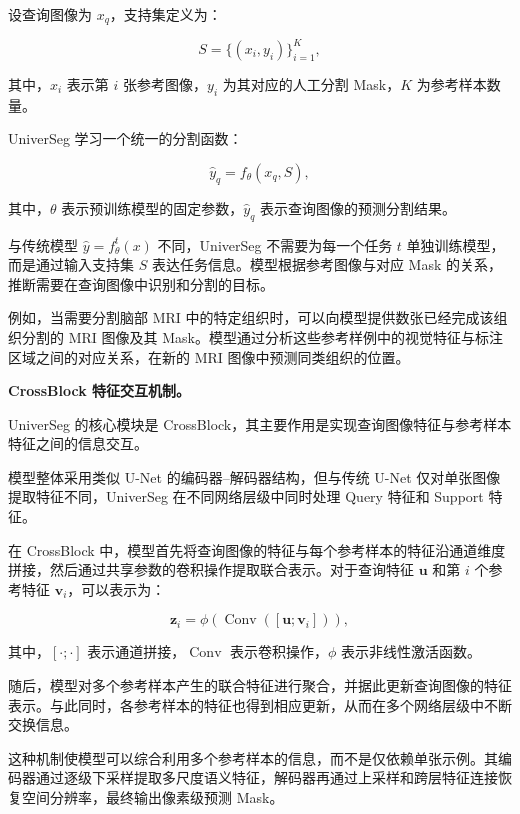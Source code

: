\documentclass[10.5pt,compsoc]{CjC}
\theoremstyle{mystyle}
\begin{document}
设查询图像为 $x_q$，支持集定义为：

\begin{equation}
S=\{(x_i,y_i)\}_{i=1}^{K},
\label{eq:universeg_support}
\end{equation}

其中，$x_i$ 表示第 $i$ 张参考图像，$y_i$ 为其对应的人工分割 Mask，$K$ 为参考样本数量。

UniverSeg 学习一个统一的分割函数：

\begin{equation}
\hat{y}_q=f_{\theta}(x_q,S),
\label{eq:universeg_forward}
\end{equation}

其中，$\theta$ 表示预训练模型的固定参数，$\hat{y}_q$ 表示查询图像的预测分割结果。

与传统模型 $\hat{y}=f_{\theta}^{t}(x)$ 不同，UniverSeg 不需要为每一个任务 $t$ 单独训练模型，而是通过输入支持集 $S$ 表达任务信息。模型根据参考图像与对应 Mask 的关系，推断需要在查询图像中识别和分割的目标。

例如，当需要分割脑部 MRI 中的特定组织时，可以向模型提供数张已经完成该组织分割的 MRI 图像及其 Mask。模型通过分析这些参考样例中的视觉特征与标注区域之间的对应关系，在新的 MRI 图像中预测同类组织的位置。

\noindent\textbf{CrossBlock 特征交互机制。}

UniverSeg 的核心模块是 CrossBlock，其主要作用是实现查询图像特征与参考样本特征之间的信息交互。

模型整体采用类似 U-Net 的编码器--解码器结构，但与传统 U-Net 仅对单张图像提取特征不同，UniverSeg 在不同网络层级中同时处理 Query 特征和 Support 特征。

在 CrossBlock 中，模型首先将查询图像的特征与每个参考样本的特征沿通道维度拼接，然后通过共享参数的卷积操作提取联合表示。对于查询特征 $\mathbf{u}$ 和第 $i$ 个参考特征 $\mathbf{v}_i$，可以表示为：

\begin{equation}
\mathbf{z}_i=
\phi\left(
\operatorname{Conv}
([\mathbf{u};\mathbf{v}_i])
\right),
\label{eq:universeg_cross}
\end{equation}

其中，$[\cdot;\cdot]$ 表示通道拼接，$\operatorname{Conv}$ 表示卷积操作，$\phi$ 表示非线性激活函数。

随后，模型对多个参考样本产生的联合特征进行聚合，并据此更新查询图像的特征表示。与此同时，各参考样本的特征也得到相应更新，从而在多个网络层级中不断交换信息。

这种机制使模型可以综合利用多个参考样本的信息，而不是仅依赖单张示例。其编码器通过逐级下采样提取多尺度语义特征，解码器再通过上采样和跨层特征连接恢复空间分辨率，最终输出像素级预测 Mask。
\end{document}
